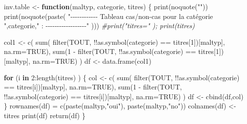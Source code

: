 \documentclass[
]{article}
\newenvironment{Shaded}{\begin{snugshade}}{\end{snugshade}}
\newcommand{\AttributeTok}[1]{\textcolor[rgb]{0.77,0.63,0.00}{#1}}
\newcommand{\CommentTok}[1]{\textcolor[rgb]{0.56,0.35,0.01}{\textit{#1}}}
\newcommand{\ConstantTok}[1]{\textcolor[rgb]{0.00,0.00,0.00}{#1}}
\newcommand{\ControlFlowTok}[1]{\textcolor[rgb]{0.13,0.29,0.53}{\textbf{#1}}}
\newcommand{\DecValTok}[1]{\textcolor[rgb]{0.00,0.00,0.81}{#1}}
\newcommand{\FunctionTok}[1]{\textcolor[rgb]{0.00,0.00,0.00}{#1}}
\newcommand{\NormalTok}[1]{#1}
\newcommand{\OtherTok}[1]{\textcolor[rgb]{0.56,0.35,0.01}{#1}}
\newcommand{\SpecialCharTok}[1]{\textcolor[rgb]{0.00,0.00,0.00}{#1}}
\newcommand{\StringTok}[1]{\textcolor[rgb]{0.31,0.60,0.02}{#1}}
\begin{document}
\begin{Shaded}
\begin{Highlighting}[]
\NormalTok{inv.table }\OtherTok{\textless{}{-}} \ControlFlowTok{function}\NormalTok{(maltyp, categorie, titres) \{}
  \FunctionTok{print}\NormalTok{(}\FunctionTok{noquote}\NormalTok{(}\StringTok{""}\NormalTok{))}
  \FunctionTok{print}\NormalTok{(}\FunctionTok{noquote}\NormalTok{(}\FunctionTok{paste}\NormalTok{( }\StringTok{"{-}{-}{-}{-}{-}{-}{-}{-}{-}{-}{-}{-} Tableau cas/non{-}cas pour la catégorie "}\NormalTok{,categorie,}\StringTok{" : {-}{-}{-}{-}{-}{-}{-}{-}{-}{-}{-}{-}{-}{-}{-}{-}{-}{-}"}\NormalTok{ )))}
  \CommentTok{\#print("titres="      ); print(titres)}

\NormalTok{  col1 }\OtherTok{\textless{}{-}} \FunctionTok{c}\NormalTok{( }\FunctionTok{sum}\NormalTok{(    }\FunctionTok{filter}\NormalTok{(TOUT, }\SpecialCharTok{!!}\FunctionTok{as.symbol}\NormalTok{(categorie) }\SpecialCharTok{==}\NormalTok{ titres[}\DecValTok{1}\NormalTok{])[maltyp], }\AttributeTok{na.rm=}\ConstantTok{TRUE}\NormalTok{), }
             \FunctionTok{sum}\NormalTok{(}\DecValTok{1} \SpecialCharTok{{-}} \FunctionTok{filter}\NormalTok{(TOUT, }\SpecialCharTok{!!}\FunctionTok{as.symbol}\NormalTok{(categorie) }\SpecialCharTok{==}\NormalTok{ titres[}\DecValTok{1}\NormalTok{])[maltyp], }\AttributeTok{na.rm=}\ConstantTok{TRUE}\NormalTok{) ) }
\NormalTok{  df }\OtherTok{\textless{}{-}}  \FunctionTok{data.frame}\NormalTok{(col1)}

  \ControlFlowTok{for}\NormalTok{ (i }\ControlFlowTok{in} \DecValTok{2}\SpecialCharTok{:}\FunctionTok{length}\NormalTok{(titres) ) \{  }
\NormalTok{    col }\OtherTok{\textless{}{-}} \FunctionTok{c}\NormalTok{( }\FunctionTok{sum}\NormalTok{(    }\FunctionTok{filter}\NormalTok{(TOUT, }\SpecialCharTok{!!}\FunctionTok{as.symbol}\NormalTok{(categorie) }\SpecialCharTok{==}\NormalTok{ titres[i])[maltyp], }\AttributeTok{na.rm=}\ConstantTok{TRUE}\NormalTok{), }
              \FunctionTok{sum}\NormalTok{(}\DecValTok{1} \SpecialCharTok{{-}} \FunctionTok{filter}\NormalTok{(TOUT, }\SpecialCharTok{!!}\FunctionTok{as.symbol}\NormalTok{(categorie) }\SpecialCharTok{==}\NormalTok{ titres[i])[maltyp], }\AttributeTok{na.rm=}\ConstantTok{TRUE}\NormalTok{) ) }
\NormalTok{    df }\OtherTok{\textless{}{-}} \FunctionTok{cbind}\NormalTok{(df,col)}
\NormalTok{   \}}
  \FunctionTok{rownames}\NormalTok{(df) }\OtherTok{=} \FunctionTok{c}\NormalTok{(}\FunctionTok{paste}\NormalTok{(maltyp,}\StringTok{"oui"}\NormalTok{), }\FunctionTok{paste}\NormalTok{(maltyp,}\StringTok{"no"}\NormalTok{))}
  \FunctionTok{colnames}\NormalTok{(df) }\OtherTok{\textless{}{-}}\NormalTok{ titres}
  \FunctionTok{print}\NormalTok{(df)}
  \FunctionTok{return}\NormalTok{(df)}
\NormalTok{\}}


\end{Highlighting}
\end{Shaded}
\end{document}
